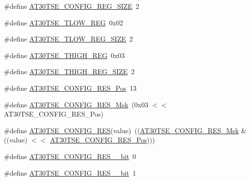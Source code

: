 \begin{DoxyCompactItemize}
\item 
\#define \mbox{\hyperlink{group__asfdoc__sam0__at30tse75x__group_gaf87ad6495bb2f835c523b47694b5740a}{A\+T30\+T\+S\+E\+\_\+\+C\+O\+N\+F\+I\+G\+\_\+\+R\+E\+G\+\_\+\+S\+I\+ZE}}~2
\item 
\#define \mbox{\hyperlink{group__asfdoc__sam0__at30tse75x__group_ga2aacaff9d9a6bd333a681539e0756359}{A\+T30\+T\+S\+E\+\_\+\+T\+L\+O\+W\+\_\+\+R\+EG}}~0x02
\item 
\#define \mbox{\hyperlink{group__asfdoc__sam0__at30tse75x__group_gaa4a3ee1d2c653eb7efa74fb7655894cd}{A\+T30\+T\+S\+E\+\_\+\+T\+L\+O\+W\+\_\+\+R\+E\+G\+\_\+\+S\+I\+ZE}}~2
\item 
\#define \mbox{\hyperlink{group__asfdoc__sam0__at30tse75x__group_ga2178fe985bde76a394a76abcd7789a51}{A\+T30\+T\+S\+E\+\_\+\+T\+H\+I\+G\+H\+\_\+\+R\+EG}}~0x03
\item 
\#define \mbox{\hyperlink{group__asfdoc__sam0__at30tse75x__group_ga7ea89f95b2e5a62eccd37469548787e3}{A\+T30\+T\+S\+E\+\_\+\+T\+H\+I\+G\+H\+\_\+\+R\+E\+G\+\_\+\+S\+I\+ZE}}~2
\item 
\#define \mbox{\hyperlink{group__asfdoc__sam0__at30tse75x__group_ga202a4ed53e4ba0b1d3ca505bdb51e97a}{A\+T30\+T\+S\+E\+\_\+\+C\+O\+N\+F\+I\+G\+\_\+\+R\+E\+S\+\_\+\+Pos}}~13
\item 
\#define \mbox{\hyperlink{group__asfdoc__sam0__at30tse75x__group_gacb3754e3b12b4c8d09609d9634593a50}{A\+T30\+T\+S\+E\+\_\+\+C\+O\+N\+F\+I\+G\+\_\+\+R\+E\+S\+\_\+\+Msk}}~(0x03 $<$$<$ A\+T30\+T\+S\+E\+\_\+\+C\+O\+N\+F\+I\+G\+\_\+\+R\+E\+S\+\_\+\+Pos)
\item 
\#define \mbox{\hyperlink{group__asfdoc__sam0__at30tse75x__group_ga2b140eecdde3fe4bf8db7d6ce6d508fe}{A\+T30\+T\+S\+E\+\_\+\+C\+O\+N\+F\+I\+G\+\_\+\+R\+ES}}(value)~((\mbox{\hyperlink{group__asfdoc__sam0__at30tse75x__group_gacb3754e3b12b4c8d09609d9634593a50}{A\+T30\+T\+S\+E\+\_\+\+C\+O\+N\+F\+I\+G\+\_\+\+R\+E\+S\+\_\+\+Msk}} \& ((value) $<$$<$ \mbox{\hyperlink{group__asfdoc__sam0__at30tse75x__group_ga202a4ed53e4ba0b1d3ca505bdb51e97a}{A\+T30\+T\+S\+E\+\_\+\+C\+O\+N\+F\+I\+G\+\_\+\+R\+E\+S\+\_\+\+Pos}})))
\item 
\#define \mbox{\hyperlink{group__asfdoc__sam0__at30tse75x__group_ga4e5f0fc674b13d133a36ef34add08b15}{A\+T30\+T\+S\+E\+\_\+\+C\+O\+N\+F\+I\+G\+\_\+\+R\+E\+S\+\_\+\_\+bit}}~0
\item 
\#define \mbox{\hyperlink{group__asfdoc__sam0__at30tse75x__group_ga6ab232a1353c01457da285281fc42fb7}{A\+T30\+T\+S\+E\+\_\+\+C\+O\+N\+F\+I\+G\+\_\+\+R\+E\+S\+\_\+\_\+bit}}~1
\item 

\end{DoxyCompactItemize}
